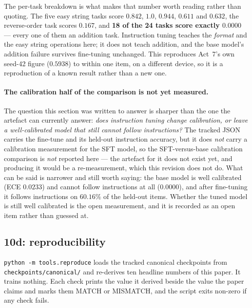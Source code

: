 \documentclass[11pt,a4paper]{article}
\begin{document}
The per-task breakdown is what makes that number worth reading rather than
quoting. The five easy string tasks score $0.842$, $1.0$, $0.944$, $0.611$
and $0.632$, the reverse-order task scores $0.167$, and \textbf{18 of the 24
tasks score exactly $0.0000$} --- every one of them an addition task.
Instruction tuning teaches the \emph{format} and the easy string operations
here; it does not teach addition, and the base model's addition failure
survives fine-tuning unchanged. This reproduces Act~7's own seed-42 figure
($0.5938$) to within one item, on a different device, so it is a
reproduction of a known result rather than a new one. %

\paragraph{The calibration half of the comparison is not yet measured.} The
question this section was written to answer is sharper than the one the
artefact can currently answer: \emph{does instruction tuning change
\emph{calibration}, or leave a well-calibrated model that still cannot follow
instructions?} The tracked JSON carries the fine-tune and its held-out
instruction accuracy, but it does \emph{not} carry a calibration measurement
for the SFT model, so the SFT-versus-base calibration comparison is \emph{not}
reported here --- the artefact for it does not exist yet, and producing it
would be a re-measurement, which this revision does not do. What can be said
is narrower and still worth saying: the base model is well calibrated (ECE
$0.0233$) and cannot follow instructions at all ($0.0000$), and after
fine-tuning it follows instructions on $60.16\%$ of the held-out items.
Whether the tuned model is still well calibrated is the open measurement, and
it is recorded as an open item rather than guessed at. %

\subsection{10d: reproducibility}
\label{sec:act10d}

\texttt{python -m tools.reproduce} loads the tracked canonical checkpoints from
\texttt{checkpoints/\allowbreak canonical/} and re-derives ten headline numbers of this
paper. It trains nothing. Each check prints the value it derived beside the
value the paper claims and marks them MATCH or MISMATCH, and the script exits
non-zero if any check fails.
\end{document}
